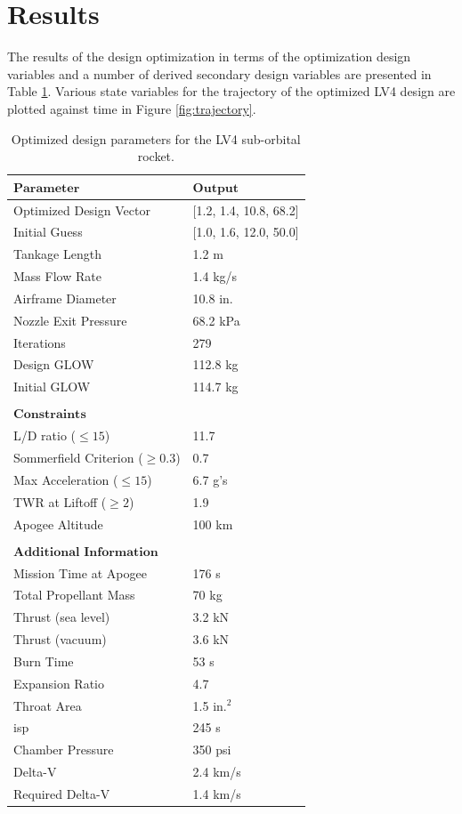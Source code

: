 \documentclass[]{aiaa-tc}%
\begin{document}
\section{Results}
The results of the design optimization in terms of the optimization design variables and a number of derived secondary design variables are presented in Table \ref{table:outputs}. Various state variables for the trajectory of the optimized LV4 design are plotted against time in Figure \ref{fig:trajectory}.

\begin{table}
\centering
	\begin{tabular}{l|l}
		\hline
		$\textbf{Parameter}$&$\textbf{Output}$\\
		\hline
		Optimized Design Vector & [1.2, 1.4, 10.8, 68.2]\\
		Initial Guess & [1.0, 1.6, 12.0, 50.0]\\
		Tankage Length & 1.2 m\\
		Mass Flow Rate & 1.4 kg/s\\
		Airframe Diameter & 10.8 in.\\
		Nozzle Exit Pressure & 68.2 kPa\\
		Iterations & 279\\
		Design GLOW & 112.8 kg\\
		Initial GLOW & 114.7 kg\\ \\
		\hline
		$\textbf{Constraints}$&\\
		\hline
		L/D ratio ($\leq15$) & 11.7\\
		Sommerfield Criterion ($\geq0.3$) & 0.7\\
		Max Acceleration ($\leq15$) & 6.7 g's\\
		TWR at Liftoff ($\geq2$) & 1.9\\
		Apogee Altitude & 100 km\\ \\
		\hline
		$\textbf{Additional Information}$&\\
		\hline
		Mission Time at Apogee & 176 s\\
		Total Propellant Mass & 70 kg\\
		Thrust (sea level) & 3.2 kN\\
		Thrust (vacuum) & 3.6 kN\\
		Burn Time & 53 s\\
		Expansion Ratio & 4.7\\
		Throat Area & 1.5 $\mbox{in.}^2$\\
		isp & 245 s\\
		Chamber Pressure & 350 psi\\
		Delta-V & 2.4 km/s\\
		Required Delta-V & 1.4 km/s\\	
	\end{tabular}
\caption{Optimized design parameters for the LV4 sub-orbital rocket.}
\label{table:outputs}
\end{table}
\end{document}
